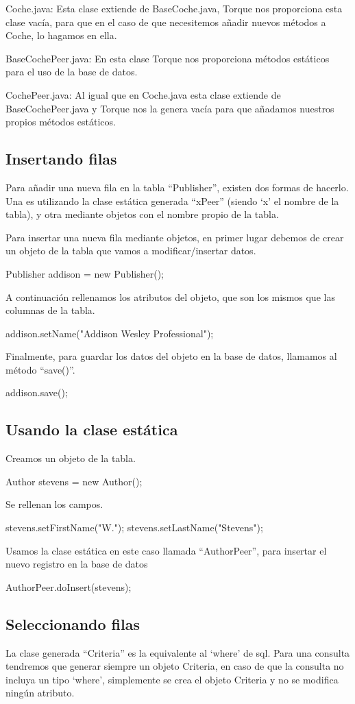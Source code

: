 \documentclass[12pt, oneside]{article}
\begin{document}
Coche.java: Esta clase extiende de BaseCoche.java, Torque nos proporciona esta clase vacía, para que en el caso de que necesitemos añadir nuevos métodos a Coche, lo hagamos en ella.

BaseCochePeer.java: En esta clase Torque nos proporciona métodos estáticos para el uso de la base de datos.

CochePeer.java: Al igual que en Coche.java esta clase extiende de BaseCochePeer.java y Torque nos la genera vacía para que añadamos nuestros propios métodos estáticos.

\subsection{Insertando filas}

Para añadir una nueva fila en la tabla “Publisher”, existen dos formas de hacerlo. Una es utilizando la clase estática generada “xPeer” (siendo ‘x’ el nombre de la tabla), y otra mediante objetos con el nombre propio de la tabla.

Para insertar una nueva fila mediante objetos, en primer lugar debemos de crear un objeto de la tabla que vamos a modificar/insertar datos.

Publisher addison = new Publisher();

A continuación rellenamos los atributos del objeto, que son los mismos que las columnas de la tabla.

addison.setName("Addison Wesley Professional");

Finalmente, para guardar los datos del objeto en la base de datos, llamamos al método “save()”.

addison.save();

\subsection{Usando la clase estática}
Creamos un objeto de la tabla.

Author stevens = new Author();

Se rellenan los campos.

stevens.setFirstName("W.");
stevens.setLastName("Stevens");

Usamos la clase estática en este caso llamada “AuthorPeer”, para insertar el nuevo registro en la base de datos

AuthorPeer.doInsert(stevens);


\subsection{Seleccionando filas}
La clase generada “Criteria” es la equivalente al ‘where’ de sql. Para una consulta tendremos que generar siempre un objeto Criteria, en caso de que la consulta no incluya un tipo ‘where’, simplemente se crea el objeto Criteria y no se modifica ningún atributo.
\end{document}
